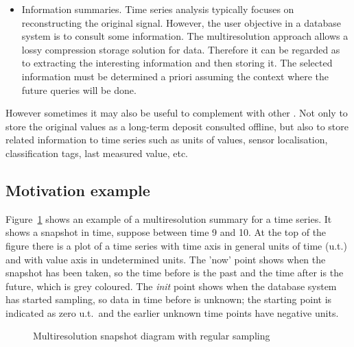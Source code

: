 \begin{itemize}
\item Information summaries. Time series analysis typically focuses on
  reconstructing the original signal. However, the user objective in a
  database system is to consult some information. The multiresolution
  approach allows a lossy compression storage solution for data. Therefore
  it can be regarded as to extracting the interesting information and
  then storing it. The selected information must be determined a
  priori assuming the context where the future queries will be done.
\end{itemize}


However sometimes it may also be useful to complement 
with other . Not only to store the original values as a
long-term deposit consulted offline, but also to store related
information to time series such as units of values, sensor
localisation, classification tags, last measured value, etc.



\subsection{Motivation example}

Figure~\ref{fig:mtsms:sequence} shows an example of a multiresolution
summary for a time series. It shows a snapshot in time, suppose
between time 9 and 10. At the top of the figure there is a plot of a
time series with time axis in general units of time (u.t.) and with
value axis in undetermined units. The 'now' point shows when the
snapshot has been taken, so the time before is the past and the time
after is the future, which is grey coloured. The \emph{init} point
shows when the database system has started sampling, so data in time
before is unknown; the starting point is indicated as zero u.t.\ and
the earlier unknown time points have negative units.


\begin{figure}
  \centering
  
  \caption{Multiresolution snapshot diagram with regular sampling}
  \label{fig:mtsms:sequence}
\end{figure}


%   



